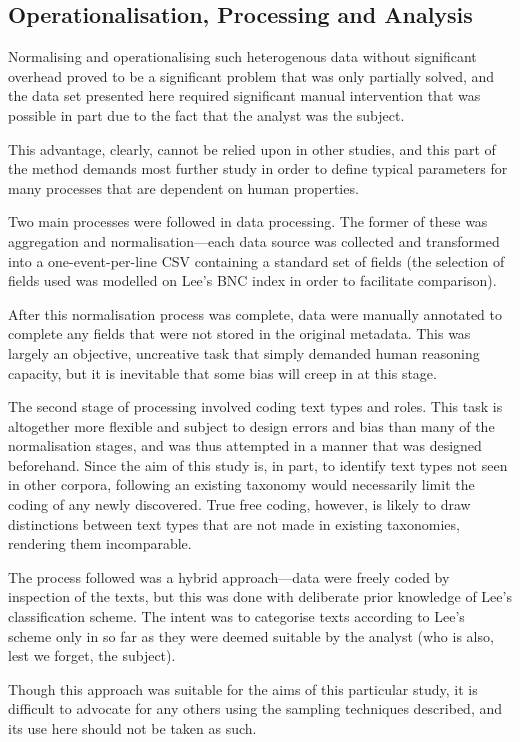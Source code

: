 \subsection{Operationalisation, Processing and Analysis}
Normalising and operationalising such heterogenous data without significant overhead proved to be a significant problem that was only partially solved, and the data set presented here required significant manual intervention that was possible in part due to the fact that the analyst was the subject.

This advantage, clearly, cannot be relied upon in other studies, and this part of the method demands most further study in order to define typical parameters for many processes that are dependent on human properties.

Two main processes were followed in data processing.  The former of these was aggregation and normalisation---each data source was collected and transformed into a one-event-per-line CSV containing a standard set of fields (the selection of fields used was modelled on Lee's BNC index in order to facilitate comparison).

After this normalisation process was complete, data were manually annotated to complete any fields that were not stored in the original metadata.  This was largely an objective, uncreative task that simply demanded human reasoning capacity, but it is inevitable that some bias will creep in at this stage.

The second stage of processing involved coding text types and roles.  This task is altogether more flexible and subject to design errors and bias than many of the normalisation stages, and was thus attempted in a manner that was designed beforehand.  Since the aim of this study is, in part, to identify text types not seen in other corpora, following an existing taxonomy would necessarily limit the coding of any newly discovered.  True free coding, however, is likely to draw distinctions between text types that are not made in existing taxonomies, rendering them incomparable.

The process followed was a hybrid approach---data were freely coded by inspection of the texts, but this was done with deliberate prior knowledge of Lee's classification scheme.  The intent was to categorise texts according to Lee's scheme only in so far as they were deemed suitable by the analyst (who is also, lest we forget, the subject).

Though this approach was suitable for the aims of this particular study, it is difficult to advocate for any others using the sampling techniques described, and its use here should not be taken as such.

